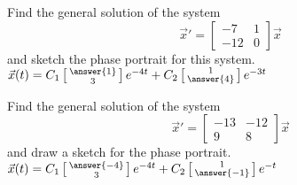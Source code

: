 \documentclass{ximera}
\begin{document}
\begin{exercise}%
    Find the general solution of the system
    \begin{equation*}
        {\vec{x}}' = 
        \begin{bmatrix} 
            -7 & 1 \\ 
            -12 & 0 
        \end{bmatrix} 
        \vec{x}
    \end{equation*}
    and sketch the phase portrait for this system.\\
    $\vec{x}(t) = C_1 \left[\begin{smallmatrix} \answer{1} \\ 3 \end{smallmatrix}\right]e^{-4t} + C_2 \left[\begin{smallmatrix} 1 \\ \answer{4} \end{smallmatrix}\right] e^{-3t}$
\end{exercise}

\begin{exercise}%
    Find the general solution of the system
    \begin{equation*}
        {\vec{x}}' = 
        \begin{bmatrix} 
            -13 & -12 \\ 
            9 & 8 
        \end{bmatrix} \vec{x}
    \end{equation*}
    and draw a sketch for the phase portrait.\\
    $\vec{x}(t) = C_1 \left[\begin{smallmatrix} \answer{-4} \\ 3 \end{smallmatrix}\right]e^{-4t} + C_2 \left[\begin{smallmatrix} 1 \\ \answer{-1} \end{smallmatrix}\right] e^{-t}$
\end{exercise}
\end{document}
